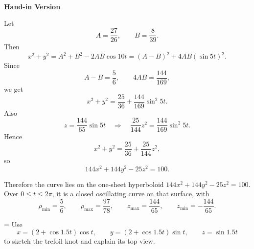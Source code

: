 \documentclass[a4paper,12pt,twocolumn]{article}
\newlength{\problemnumberwidth}
\newenvironment{solutionbox}{\begin{framed}}{\end{framed}}
\newcommand{\problem}[3]{%
  \Needspace{10\baselineskip}%
  \phantomsection\label{#1}%
  \par\vspace{0.8em}%
  \noindent
  \hangindent=\problemnumberwidth
  \hangafter=1
  \makebox[\problemnumberwidth][l]{\textbf{#2.}}#3\par
}
\begin{document}
\begin{solutionbox}
\textbf{Hand-in Version}

Let
\[
A=\frac{27}{26},\qquad B=\frac{8}{39}.
\]
Then
\[
x^2+y^2=A^2+B^2-2AB\cos 10t
={(A-B)}^2+4AB{(\sin 5t)}^2.
\]
Since
\[
A-B=\frac56,\qquad 4AB=\frac{144}{169},
\]
we get
\[
x^2+y^2=\frac{25}{36}+\frac{144}{169}\sin^2 5t.
\]
Also
\[
z=\frac{144}{65}\sin 5t
\quad\Longrightarrow\quad
\frac{25}{144}z^2=\frac{144}{169}\sin^2 5t.
\]
Hence
\[
x^2+y^2=\frac{25}{36}+\frac{25}{144}z^2,
\]
so
\[
\boxed{144x^2+144y^2-25z^2=100.}
\]

Therefore the curve lies on the one-sheet hyperboloid \(144x^2+144y^2-25z^2=100\). Over \(0\le t\le 2\pi\), it is a closed oscillating curve on that surface, with
\[
\rho_{\min}=\frac56,\qquad
\rho_{\max}=\frac{97}{78},\qquad
z_{\max}=\frac{144}{65},\qquad
z_{\min}=-\frac{144}{65}.
\]

\begin{center}
\end{center}
\end{solutionbox}

\problem{prob:13-1-60}{60}{Use
\[
x=(2+\cos 1.5t)\cos t,\qquad
y=(2+\cos 1.5t)\sin t,\qquad
z=\sin 1.5t
\]
to sketch the trefoil knot and explain its top view.}
\end{document}
